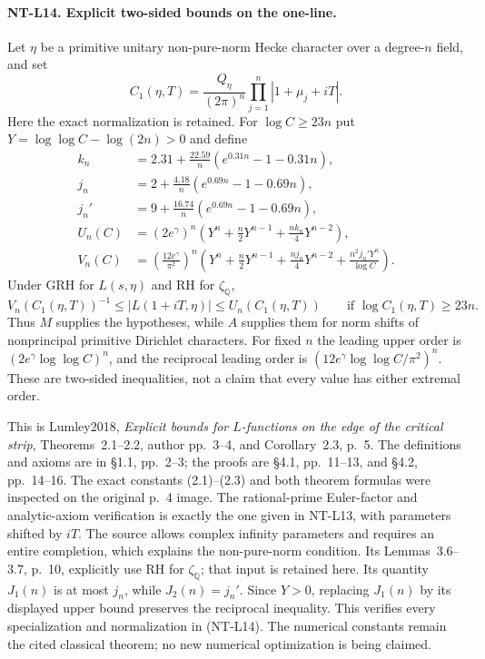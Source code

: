 \paragraph{NT-L14. Explicit two-sided bounds on the one-line.}
Let $\eta$ be a primitive unitary non-pure-norm Hecke character
over a degree-$n$ field, and set
\[
 C_1(\eta,T)=\frac{Q_\eta}{(2\pi)^n}
                   \prod_{j=1}^n|1+\mu_j+iT|.
\]
Here the exact normalization is retained.
For $\log C\ge23n$ put $Y=\log\log C-\log(2n)>0$ and define
\begin{align*}
 k_n&=2.31+\frac{22.59}{n}(e^{0.31n}-1-0.31n),\\
 j_n&=2+\frac{4.18}{n}(e^{0.69n}-1-0.69n),\\
 j_n'&=9+\frac{16.74}{n}(e^{0.69n}-1-0.69n),\\
 U_n(C)&=(2e^\gamma)^n
       \left(Y^n+\frac n2Y^{n-1}+\frac{nk_n}4Y^{n-2}\right),\\
 V_n(C)&=\left(\frac{12e^\gamma}{\pi^2}\right)^n
       \left(Y^n+\frac n2Y^{n-1}+\frac{nj_n}4Y^{n-2}
                         +\frac{n^2j_n'Y^n}{\log C}\right).
\end{align*}
Under GRH for $L(s,\eta)$ and RH for $\zeta_{\mathbb Q}$,
\[
  V_n(C_1(\eta,T))^{-1}
        \le |L(1+iT,\eta)|\le U_n(C_1(\eta,T))
        \qquad\text{if }\log C_1(\eta,T)\ge23n.
\tag{NT-L14}
\]
Thus $M$ supplies the hypotheses, while $A$ supplies them for
norm shifts of nonprincipal primitive Dirichlet characters.
For fixed $n$ the leading upper order is
$(2e^\gamma\log\log C)^n$, and the reciprocal leading order
is $(12e^\gamma\log\log C/\pi^2)^n$.
These are two-sided inequalities, not a claim that every value
has either extremal order.

This is Lumley2018, \emph{Explicit bounds for $L$-functions
on the edge of the critical strip}, Theorems~2.1--2.2,
author pp.~3--4, and Corollary~2.3, p.~5.
The definitions and axioms are in \S1.1, pp.~2--3;
the proofs are \S4.1, pp.~11--13, and \S4.2, pp.~14--16.
The exact constants (2.1)--(2.3) and both theorem formulas
were inspected on the original p.~4 image.
The rational-prime Euler-factor and analytic-axiom verification
is exactly the one given in NT-L13, with parameters shifted
by $iT$.  The source allows complex infinity parameters and
requires an entire completion, which explains the non-pure-norm
condition.  Its Lemmas~3.6--3.7, p.~10, explicitly use RH for
$\zeta_{\mathbb Q}$; that input is retained here.
Its quantity $J_1(n)$ is at most $j_n$, while $J_2(n)=j_n'$.
Since $Y>0$, replacing $J_1(n)$ by its displayed upper bound
preserves the reciprocal inequality.  This verifies every
specialization and normalization in (NT-L14).
The numerical constants remain the cited classical theorem;
no new numerical optimization is being claimed.

